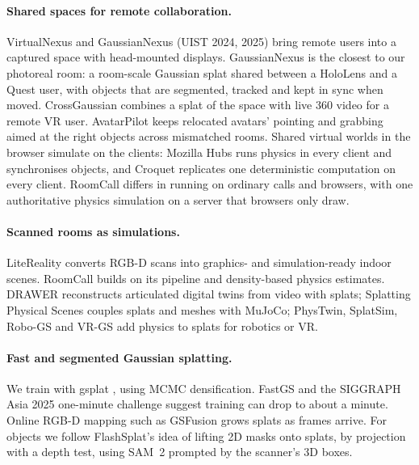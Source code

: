 \documentclass[sigconf,review,anonymous]{acmart}
\newcommand{\sys}{RoomCall}
\begin{document}
\paragraph{Shared spaces for remote collaboration.}
VirtualNexus \cite{virtualnexus} and GaussianNexus \cite{gaussiannexus} (UIST 2024, 2025) bring
remote users into a captured space with head-mounted displays. GaussianNexus is the closest to our
photoreal room: a room-scale Gaussian splat shared between a HoloLens and a Quest user, with
objects that are segmented, tracked and kept in sync when moved. CrossGaussian
\cite{crossgaussian} combines a splat of the space with live 360\textdegree{} video for a remote VR
user. AvatarPilot \cite{avatarpilot} keeps relocated avatars' pointing and grabbing aimed at the
right objects across mismatched rooms. Shared virtual worlds in the browser simulate on the
clients: Mozilla Hubs \cite{hubs} runs physics in every client and synchronises objects, and
Croquet \cite{croquet} replicates one deterministic computation on every client. \sys{} differs
in running on ordinary calls and browsers, with one authoritative physics simulation on a server
that browsers only draw.

\paragraph{Scanned rooms as simulations.}
LiteReality \cite{litereality} converts RGB-D scans into graphics- and simulation-ready
indoor scenes. \sys{} builds on its pipeline and density-based physics estimates.
DRAWER \cite{drawer} reconstructs articulated digital twins from video with splats; Splatting
Physical Scenes \cite{splattingphysical} couples splats and meshes with MuJoCo; PhysTwin, SplatSim,
Robo-GS and VR-GS \cite{phystwin,splatsim,robogs,vrgs} add physics to splats for robotics or VR.


\paragraph{Fast and segmented Gaussian splatting.}
We train with gsplat \cite{gsplat}, using MCMC densification. FastGS and the SIGGRAPH Asia 2025
one-minute challenge \cite{fastgs,oneminute} suggest training can drop to about a minute.
Online RGB-D mapping such as GSFusion \cite{gsfusion} grows splats as frames arrive. For objects
we follow FlashSplat's \cite{flashsplat} idea of lifting 2D masks onto splats, by projection with
a depth test, using SAM~2 \cite{sam2} prompted by the scanner's 3D boxes.
\end{document}

